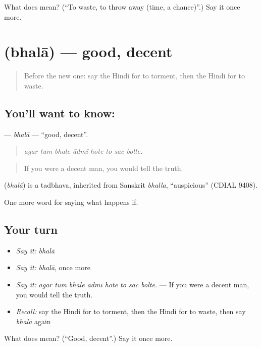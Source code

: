 \begin{tcolorbox}[breakable,colback=teal!4,colframe=teal!35!black,title={Before you move on}]
What does  mean? (\textquotedblleft{}To waste, to throw away (time, a chance)\textquotedblright{}.) Say it once more.
\end{tcolorbox}
\section[\texorpdfstring{\hi{भला} (bhalā)}{भला (bhalā)}]{ (bhalā) — good, decent}

\label{lesson:HI-C381-bhala}



\begin{quote}
Before the new one: say the Hindi for to torment, then the Hindi for to waste.
\end{quote}

\subsection*{You'll want to know: }
\textbf{} — \emph{bhalā} — \textquotedblleft{}good, decent\textquotedblright{}.

\begin{quote}
       
\end{quote}

\begin{quote}
\emph{agar tum bhale ādmī hote to sac bolte.}
\end{quote}

\begin{quote}
If you were a decent man, you would tell the truth.
\end{quote}

\begin{cousinweb}
\textbf{} (\emph{bhalā}) is a tadbhava, inherited from Sanskrit \emph{bhalla}, \textquotedblleft{}auspicious\textquotedblright{} (CDIAL 9408).
\end{cousinweb}

\begin{grammarlens}[title={What you've built}]
One more word for saying what happens if.
\end{grammarlens}

\subsection*{Your turn}
\begin{itemize}
\raggedright
  \item \emph{Say it:} \emph{bhalā}
  \item \emph{Say it:} \emph{bhalā}, once more
  \item \emph{Say it:} \emph{agar tum bhale ādmī hote to sac bolte.} — If you were a decent man, you would tell the truth.
  \item \emph{Recall:} say the Hindi for to torment, then the Hindi for to waste, then say \emph{bhalā} again
\end{itemize}

\begin{tcolorbox}[breakable,colback=teal!4,colframe=teal!35!black,title={Before you move on}]
What does  mean? (\textquotedblleft{}Good, decent\textquotedblright{}.) Say it once more.
\end{tcolorbox}
